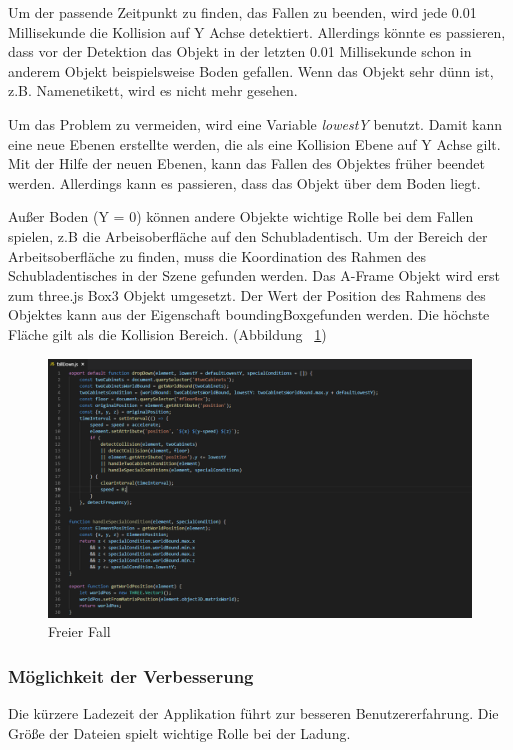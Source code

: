   Um der passende Zeitpunkt zu finden, das Fallen zu beenden, wird jede 0.01 Millisekunde die Kollision auf Y Achse detektiert. Allerdings könnte es passieren, dass vor der Detektion das Objekt in der letzten 0.01 Millisekunde schon in anderem Objekt beispielsweise Boden gefallen. Wenn das Objekt sehr dünn ist, z.B. Namenetikett, wird es nicht mehr gesehen.
  
  Um das Problem zu vermeiden, wird eine Variable \textit{lowestY} benutzt. Damit kann eine neue Ebenen erstellte werden, die als eine Kollision Ebene auf Y Achse gilt. Mit der Hilfe der neuen Ebenen, kann das Fallen des Objektes früher beendet werden. Allerdings kann es passieren, dass das Objekt über dem Boden liegt.
  
  Außer Boden (Y = 0) können andere Objekte wichtige Rolle bei dem Fallen spielen, z.B die Arbeisoberfläche auf den Schubladentisch. Um der Bereich der Arbeitsoberfläche zu finden, muss die Koordination des Rahmen des Schubladentisches in der Szene gefunden werden. Das A-Frame Objekt wird erst zum three.js Box3 Objekt umgesetzt. Der Wert der Position des Rahmens des Objektes kann aus der Eigenschaft \glqq boundingBox\grqq gefunden werden. Die höchste Fläche gilt als die Kollision Bereich. (Abbildung ~\ref{fig:fallDown})
  
\begin{figure}[ht]
\vspace*{1cm}
\centering
\includegraphics[width=\textwidth]{images/fallDown.png}
\caption[Freier Fall]{Freier Fall}
\label{fig:fallDown} 
\end{figure}
  
  \subsubsection{Möglichkeit der Verbesserung}
  Die kürzere Ladezeit der Applikation führt zur besseren Benutzererfahrung. Die Größe der Dateien spielt wichtige Rolle bei der Ladung.
  
